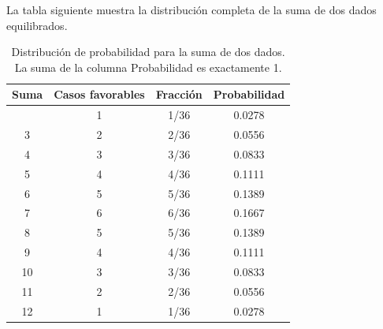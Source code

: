 \documentclass[
  spanish,
  letterpaper,
  DIV=11,
  numbers=noendperiod]{scrartcl}
\begin{document}
La tabla siguiente muestra la distribución completa de la suma de dos
dados equilibrados.

{

\begin{longtable}[]{@{}cccc@{}}

\caption{\label{tbl-dados}Distribución de probabilidad para la suma de
dos dados. La suma de la columna Probabilidad es exactamente 1.}

\tabularnewline

\toprule\noalign{}
Suma & Casos favorables & Fracción & Probabilidad \\
\midrule\noalign{}
\endhead
\bottomrule\noalign{}
\endlastfoot
2 & 1 & 1/36 & 0.0278 \\
3 & 2 & 2/36 & 0.0556 \\
4 & 3 & 3/36 & 0.0833 \\
5 & 4 & 4/36 & 0.1111 \\
6 & 5 & 5/36 & 0.1389 \\
7 & 6 & 6/36 & 0.1667 \\
8 & 5 & 5/36 & 0.1389 \\
9 & 4 & 4/36 & 0.1111 \\
10 & 3 & 3/36 & 0.0833 \\
11 & 2 & 2/36 & 0.0556 \\
12 & 1 & 1/36 & 0.0278 \\

\end{longtable}

}
\end{document}
